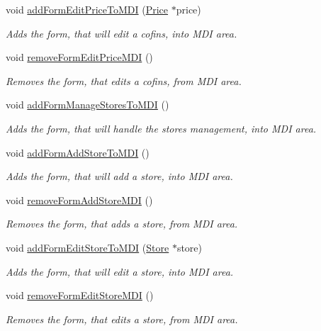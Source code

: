 \begin{DoxyCompactItemize}
void \hyperlink{class_main_window_a7165f1367872acbb72668945cfd658d7}{add\-Form\-Edit\-Price\-To\-M\-D\-I} (\hyperlink{class_price}{\-Price} $\ast$price)
\begin{DoxyCompactList}\small\item\em \-Adds the form, that will edit a cofins, into \-M\-D\-I area. \end{DoxyCompactList}\item 
void \hyperlink{class_main_window_a3b4f54e4163f870d665a9c936177806b}{remove\-Form\-Edit\-Price\-M\-D\-I} ()
\begin{DoxyCompactList}\small\item\em \-Removes the form, that edits a cofins, from \-M\-D\-I area. \end{DoxyCompactList}\item 
void \hyperlink{class_main_window_a92319316f5f2c7d3da1bb1871e9e82f9}{add\-Form\-Manage\-Stores\-To\-M\-D\-I} ()
\begin{DoxyCompactList}\small\item\em \-Adds the form, that will handle the stores management, into \-M\-D\-I area. \end{DoxyCompactList}\item 
void \hyperlink{class_main_window_ab81ff064e3d4bb24bf93ab41e7b287f8}{add\-Form\-Add\-Store\-To\-M\-D\-I} ()
\begin{DoxyCompactList}\small\item\em \-Adds the form, that will add a store, into \-M\-D\-I area. \end{DoxyCompactList}\item 
void \hyperlink{class_main_window_a02590619171ba5791146649d1ca48c6e}{remove\-Form\-Add\-Store\-M\-D\-I} ()
\begin{DoxyCompactList}\small\item\em \-Removes the form, that adds a store, from \-M\-D\-I area. \end{DoxyCompactList}\item 
void \hyperlink{class_main_window_a6c3c439b0cb60c43363b6964f0792cc2}{add\-Form\-Edit\-Store\-To\-M\-D\-I} (\hyperlink{class_store}{\-Store} $\ast$store)
\begin{DoxyCompactList}\small\item\em \-Adds the form, that will edit a store, into \-M\-D\-I area. \end{DoxyCompactList}\item 
void \hyperlink{class_main_window_af1e2cd14ce14741dec843f199c0fec42}{remove\-Form\-Edit\-Store\-M\-D\-I} ()
\begin{DoxyCompactList}\small\item\em \-Removes the form, that edits a store, from \-M\-D\-I area. \end{DoxyCompactList}\end{DoxyCompactItemize}
